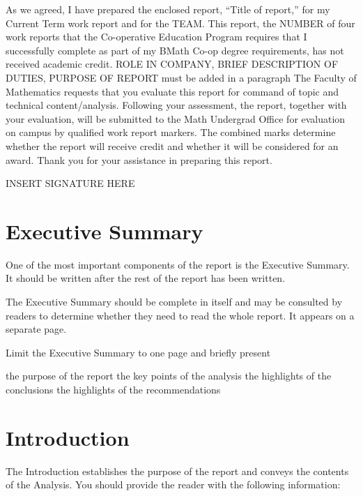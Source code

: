\documentclass{article}
\newcommand{\term}{Current Term } %
\newcommand{\WTT}{Title of report}
\begin{document}
\FirstPage

\newpage

\LetterHead



As we agreed, I have prepared the enclosed report, “\WTT,” for
my \term work report and for the TEAM. This
report, the NUMBER of four work reports that the Co-operative Education Program
requires that I successfully complete as part of my BMath Co-op degree
requirements, has not received academic credit.
\vskip 10pt
ROLE IN COMPANY, BRIEF DESCRIPTION OF DUTIES, PURPOSE OF REPORT must be added in a paragraph
\vskip 10pt 
The Faculty of Mathematics requests that you evaluate this report for command
of topic and technical content/analysis. Following your assessment, the report,
together with your evaluation, will be submitted to the Math Undergrad Office
for evaluation on campus by qualified work report markers. The combined
marks determine whether the report will receive credit and whether it will be
considered for an award.
Thank you for your assistance in preparing this report.

INSERT SIGNATURE HERE


\toc 

\section*{Executive Summary}

One of the most important components of the report is the Executive Summary. It should be written after the rest of the report has been written.

The Executive Summary should be complete in itself and may be consulted by readers to determine whether they need to read the whole report. It appears on a separate page.

Limit the Executive Summary to one page and briefly present

the purpose of the report
the key points of the analysis
the highlights of the conclusions
the highlights of the recommendations

\newpage

\fancyhf{}
\fancyfoot[R]{\thepage}

\section{Introduction}
The Introduction establishes the purpose of the report and conveys the contents of the Analysis. You should provide the reader with the following information:
\end{document}

